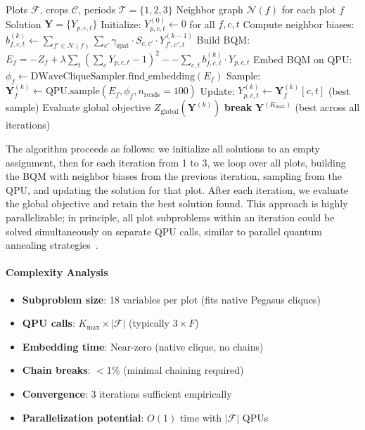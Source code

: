 \documentclass{oqireport}
\begin{document}
\begin{algorithm}
\caption{Clique Decomposition with Iterative Refinement}
\begin{algorithmic}[1]
\Require Plots $\mathcal{F}$, crops $\mathcal{C}$, periods $\mathcal{T} = \{1,2,3\}$
\Require Neighbor graph $\mathcal{N}(f)$ for each plot $f$
\Ensure Solution $\mathbf{Y} = \{Y_{p,c,t}\}$
\State Initialize: $Y_{p,c,t}^{(0)} \leftarrow 0$ for all $f, c, t$
        \State Compute neighbor biases: $b_{f,c,t}^{(k)} \leftarrow \sum_{f' \in \mathcal{N}(f)} \sum_{c'} \gamma_{\text{spat}} \cdot S_{c,c'} \cdot Y_{f',c',t}^{(k-1)}$
        \State Build BQM: $E_f = -Z_f + \lambda \sum_t (\sum_c Y_{p,c,t} -1)^2 -- \sum_{c,t} b_{f,c,t}^{(k)} \cdot Y_{p,c,t}$
        \State Embed BQM on QPU: $\phi_f \leftarrow \text{DWaveCliqueSampler.find\_embedding}(E_f)$
        \State Sample: $\mathbf{Y}_f^{(k)} \leftarrow \text{QPU.sample}(E_f, \phi_f, n_{\text{reads}} = 100)$
        \State Update: $Y_{p,c,t}^{(k)} \leftarrow \mathbf{Y}_f^{(k)}[c,t]$ (best sample)
    \EndFor
    \State Evaluate global objective $Z_{\text{global}}(\mathbf{Y}^{(k)})$
        \State \textbf{break}
    \EndIf
\EndFor
\State \Return $\mathbf{Y}^{(K_{\text{max}})}$ (best across all iterations)
\end{algorithmic}
\end{algorithm}

The algorithm proceeds as follows: we initialize all solutions to an empty assignment, then for each iteration from 1 to 3, we loop over all plots, building the BQM with neighbor biases from the previous iteration, sampling from the QPU, and updating the solution for that plot. After each iteration, we evaluate the global objective and retain the best solution found. This approach is highly parallelizable; in principle, all plot subproblems within an iteration could be solved simultaneously on separate QPU calls, similar to parallel quantum annealing strategies~\cite{pelofske2021parallel}.

\paragraph{Complexity Analysis}
\begin{itemize}
\item \textbf{Subproblem size}: 18 variables per plot (fits native Pegasus cliques)
\item \textbf{QPU calls}: $K_{\text{max}} \times |\mathcal{F}|$ (typically $3 \times F$)
\item \textbf{Embedding time}: Near-zero (native clique, no chains)
\item \textbf{Chain breaks}: $<$1\% (minimal chaining required)
\item \textbf{Convergence}: 3 iterations sufficient empirically
\item \textbf{Parallelization potential}: $O(1)$ time with $|\mathcal{F}|$ QPUs
\end{itemize}
\end{document}
